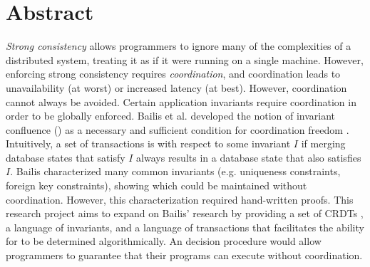 \section{Abstract}
\emph{Strong consistency} allows programmers to ignore many of the complexities
of a distributed system, treating it as if it were running on a single machine.
However, enforcing strong consistency requires \emph{coordination}, and
coordination leads to unavailability \cite{gilbert2002brewer} (at worst) or
increased latency (at best). However, coordination cannot always be avoided.
Certain application invariants require coordination in order to be globally
enforced. Bailis et al. developed the notion of invariant confluence
(\iconfluence{}) as a necessary and sufficient condition for coordination
freedom \cite{bailis2014coordination}. Intuitively, a set of transactions is
\iconfluent{} with respect to some invariant $I$ if merging database states
that satisfy $I$ always results in a database state that also satisfies $I$.
Bailis characterized many common invariants (e.g. uniqueness constraints,
foreign key constraints), showing which could be maintained without
coordination. However, this characterization required hand-written proofs. This
research project aims to expand on Bailis' research by providing a set of
CRDTs \cite{shapiro2011comprehensive, shapiro2011conflict}, a language of
invariants, and a language of transactions that facilitates the ability for
\iconfluence{} to be determined algorithmically. An \iconfluence{} decision
procedure would allow programmers to guarantee that their programs can execute
without coordination.

